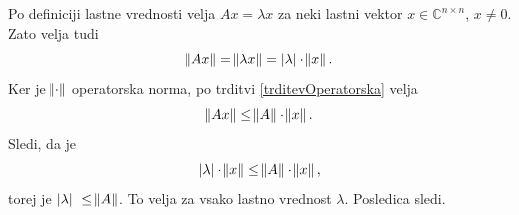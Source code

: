 \documentclass[mat1]{fmfdelo}
\newcommand{\C}{\mathbb C}
\begin{document}
\begin{dokaz}
    Po definiciji lastne vrednosti velja $A x = \lambda x$ za neki lastni vektor $x \in \C^{n \times n}$, $x \neq 0 $. Zato velja tudi
    \begin{equation*}
        \norm{A x} = \norm{\lambda x} = |\lambda|\cdot \norm{x}.
    \end{equation*}    
    Ker je $\norm{\cdot}$ operatorska norma, po trditvi \ref{trditevOperatorska} velja
    \begin{equation*}
        \norm{A x} \leq \norm{A} \cdot \norm{x}.
    \end{equation*}
    Sledi, da je
    \begin{equation*}
        |\lambda|\cdot \norm{x} \leq \norm{A} \cdot \norm{x},
    \end{equation*}
    torej je $|\lambda| \leq \norm{A}$. To velja za vsako lastno vrednost $\lambda$. Posledica sledi.
\end{dokaz}
\end{document}
